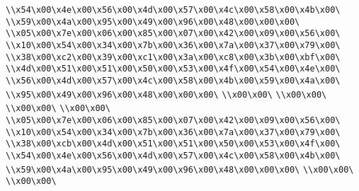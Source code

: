 \verb|\\x54\x00\x4e\x00\x56\x00\x4d\x00\x57\x00\x4c\x00\x58\x00\x4b\x00\|\newline
\verb|\\x59\x00\x4a\x00\x95\x00\x49\x00\x96\x00\x48\x00\x00\x00\|\newline
\verb|\\x05\x00\x7e\x00\x06\x00\x85\x00\x07\x00\x42\x00\x09\x00\x56\x00\|\newline
\verb|\\x10\x00\x54\x00\x34\x00\x7b\x00\x36\x00\x7a\x00\x37\x00\x79\x00\|\newline
\verb|\\x38\x00\xc2\x00\x39\x00\xc1\x00\x3a\x00\xc8\x00\x3b\x00\xbf\x00\|\newline
\verb|\\x4d\x00\x51\x00\x51\x00\x50\x00\x53\x00\x4f\x00\x54\x00\x4e\x00\|\newline
\verb|\\x56\x00\x4d\x00\x57\x00\x4c\x00\x58\x00\x4b\x00\x59\x00\x4a\x00\|\newline
\verb|\\x95\x00\x49\x00\x96\x00\x48\x00\x00\x00\|\newline
\verb|\\x00\x00\|\newline
\verb|\\x00\x00\|\newline
\verb|\\x00\x00\|\newline
\verb|\\x00\x00\|\newline
\verb|\\x05\x00\x7e\x00\x06\x00\x85\x00\x07\x00\x42\x00\x09\x00\x56\x00\|\newline
\verb|\\x10\x00\x54\x00\x34\x00\x7b\x00\x36\x00\x7a\x00\x37\x00\x79\x00\|\newline
\verb|\\x38\x00\xcb\x00\x4d\x00\x51\x00\x51\x00\x50\x00\x53\x00\x4f\x00\|\newline
\verb|\\x54\x00\x4e\x00\x56\x00\x4d\x00\x57\x00\x4c\x00\x58\x00\x4b\x00\|\newline
\verb|\\x59\x00\x4a\x00\x95\x00\x49\x00\x96\x00\x48\x00\x00\x00\|\newline
\verb|\\x00\x00\|\newline
\verb|\\x00\x00\|\newline
